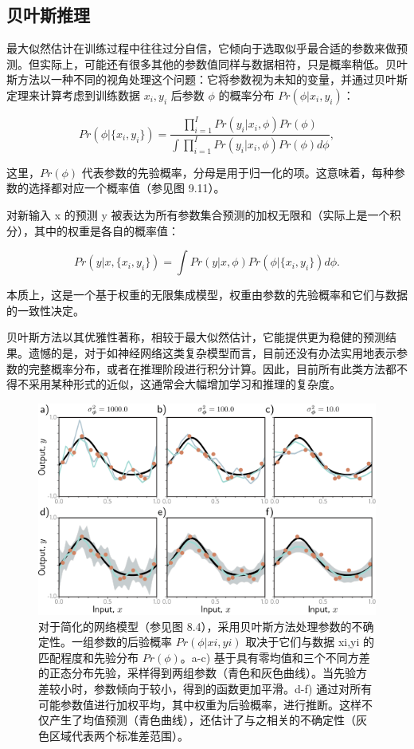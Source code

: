 \subsection{贝叶斯推理}
最大似然估计在训练过程中往往过分自信，它倾向于选取似乎最合适的参数来做预测。但实际上，可能还有很多其他的参数值同样与数据相符，只是概率稍低。贝叶斯方法以一种不同的视角处理这个问题：它将参数视为未知的变量，并通过贝叶斯定理来计算考虑到训练数据 \({x_i, y_i}\) 后参数 \(\phi\) 的概率分布  \(Pr(\phi | {x_i, y_i})\)：

\begin{equation}
Pr(\phi | \{x_i, y_i\}) = \frac{\prod_{i=1}^{I} Pr(y_i|x_i, \phi)Pr(\phi)}{\int \prod_{i=1}^{I} Pr(y_i|x_i, \phi)Pr(\phi)d\phi}, 
\end{equation}

这里，\(Pr(\phi)\) 代表参数的先验概率，分母是用于归一化的项。这意味着，每种参数的选择都对应一个概率值（参见图 9.11）。

对新输入 x 的预测 y 被表达为所有参数集合预测的加权无限和（实际上是一个积分），其中的权重是各自的概率值：

\begin{equation}
Pr(y|x, \{x_i, y_i\}) = \int Pr(y|x, \phi)Pr(\phi | \{x_i, y_i\})d\phi. 
\end{equation}

本质上，这是一个基于权重的无限集成模型，权重由参数的先验概率和它们与数据的一致性决定。

贝叶斯方法以其优雅性著称，相较于最大似然估计，它能提供更为稳健的预测结果。遗憾的是，对于如神经网络这类复杂模型而言，目前还没有办法实用地表示参数的完整概率分布，或者在推理阶段进行积分计算。因此，目前所有此类方法都不得不采用某种形式的近似，这通常会大幅增加学习和推理的复杂度。

\begin{figure}[ht!]
	\centering
	\includegraphics[width=0.7\linewidth]{png/chapter9/RegBayesian.png}
	\caption{对于简化的网络模型（参见图 8.4），采用贝叶斯方法处理参数的不确定性。一组参数的后验概率 \(Pr(\phi|{xi,yi})\) 取决于它们与数据 {xi,yi} 的匹配程度和先验分布 \(Pr(\phi)\)。a-c) 基于具有零均值和三个不同方差的正态分布先验，采样得到两组参数（青色和灰色曲线）。当先验方差较小时，参数倾向于较小，得到的函数更加平滑。d-f) 通过对所有可能参数值进行加权平均，其中权重为后验概率，进行推断。这样不仅产生了均值预测（青色曲线），还估计了与之相关的不确定性（灰色区域代表两个标准差范围）。}
\end{figure}

